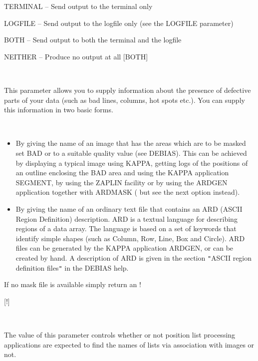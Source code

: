 \documentclass[twoside,11pt]{article}
\newcommand{\htmlref}[2]{#1}
\newcommand{\xref}[3]{#1}
\renewcommand{\_}{\texttt{\symbol{95}}}
\newcommand{\qt}[1]{{\tt "}#1{\tt "}}
\newcommand{\xroutine}[1]{\htmlref{{\sc #1}}{#1}}
\newcommand{\sstsubsection}[1]{ \item[{#1}] \mbox{} \\}
\newcommand{\sstitemlist}[1]{
  \mbox{} \\
  \vspace{-3.5ex}
  \begin{itemize}
     #1
  \end{itemize}
}
\newcommand{\sstitem}{\item}
\newcommand{\sstsubsection}[1]{\item[{#1}]}
\newcommand{\sstitemlist}[1]{
      \begin{itemize}
         #1
      \end{itemize}
      \\
   }
\newcommand{\sstitem}{\item}
\begin{document}
{{{{            \sstitem
               TERMINAL  -- Send output to the terminal only

            \sstitem
               LOGFILE   -- Send output to the logfile only (see the
                               LOGFILE parameter)

            \sstitem
               BOTH      -- Send output to both the terminal and the
                               logfile

            \sstitem
               NEITHER   -- Produce no output at all
            [BOTH]
         }
      }
      \sstsubsection{
         MASK = LITERAL (Read and Write)
      } {
         This parameter allows you to supply information about the
         presence of defective parts of your data (such as bad lines,
         columns, hot spots etc.). You can supply this information in
         two basic forms.

         \sstitemlist{

            \sstitem
              By giving the name of an image that has the areas which are
                to be masked set BAD or to a suitable quality value
                (see \xroutine{DEBIAS}). This can be achieved by displaying a typical
                image using KAPPA, getting logs of the positions of an outline
                enclosing the BAD area and using the KAPPA application
                \xref{SEGMENT}{sun95}{SEGMENT}, by using the
                \xref{ZAPLIN}{sun95}{ZAPLIN}
                facility or by using the \xref{ARDGEN}{sun95}{ARDGEN}
                application together with \xref{ARDMASK}{sun95}{ARDMASK} (
                but see the next option instead).

            \sstitem
              By giving the name of an ordinary text file that contains an
                ARD (ASCII Region Definition) description. ARD is a textual
                language for describing regions of a data array. The
                language is based on a set of keywords that identify simple
                shapes (such as Column, Row, Line, Box and Circle).  ARD
                files can be generated by the KAPPA application
                \xref{ARDGEN}{sun95}{}, or
                can be created by hand. A description of ARD is given in
                the section \qt{ASCII region definition files} in the
                \xroutine{DEBIAS} help.

         }
         If no mask file is available simply return an !

         [!]
      }
      \sstsubsection{
         NDFNAMES = \_LOGICAL (Read and Write)
      } {
         The value of this parameter controls whether or not position
         list processing applications are expected to find the names of
         lists via association with images or not.

}}}
\end{document}

